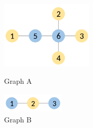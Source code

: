 \documentclass{l4proj}
\newcounter{example}[section]
\begin{document}
\begin{figure}[h]
\centering
\begin{minipage}[t]{.5\textwidth}
  \centering
  \includegraphics[height=3.3cm,width=4.4cm]{images/graphs/C2H4-1.png}
  \caption{Graph A}
  \label{C2H4-1}
\end{minipage}%
\begin{minipage}[t]{.5\textwidth}
  \centering
  \includegraphics[height=1cm,width=3cm]{images/graphs/C2H.png}
  \caption{Graph B}
  \label{C2H}
\end{minipage}%

\end{figure}
\end{document}
